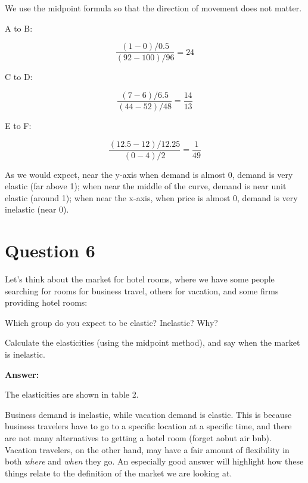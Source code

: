 \documentclass[12pt]{article}
\begin{document}
We use the midpoint formula so that the direction of movement does not matter. 

\vspace{2mm}

A to B:

$$ \dfrac{(1-0)/0.5}{(92-100)/96} = 24 $$

\vspace{2mm}

C to D:

$$ \dfrac{(7-6)/6.5}{(44-52)/48} = \dfrac{14}{13} $$

\vspace{2mm}

E to F:

$$ \dfrac{(12.5-12)/12.25}{(0-4)/2} = \dfrac{1}{49} $$

As we would expect, near the y-axis when demand is almost 0, demand is very elastic (far above 1); when near the middle of the curve, demand is near unit elastic (around 1); when near the x-axis, when price is almost 0, demand is very inelastic (near 0).


\section*{Question 6}
Let's think about the market for hotel rooms, where we have some people searching for rooms for business travel, others for vacation, and some firms providing hotel rooms:

\begin{center}

\end{center}

Which group do you expect to be elastic? Inelastic? Why?

\medskip
\medskip

Calculate the elasticities (using the midpoint method), and say when the market is inelastic.

\vspace{2mm}
\textbf{Answer:}

\vspace{2mm}

The elasticities are shown in table 2.



Business demand is inelastic, while vacation demand is elastic. This is because business travelers have to go to a specific location at a specific time, and there are not many alternatives to getting a hotel room (forget aobut air bnb). Vacation travelers, on the other hand, may have a fair amount of flexibility in both \textit{where} and \textit{when} they go. An especially good answer will highlight how these things relate to the definition of the market we are looking at.
\end{document}

